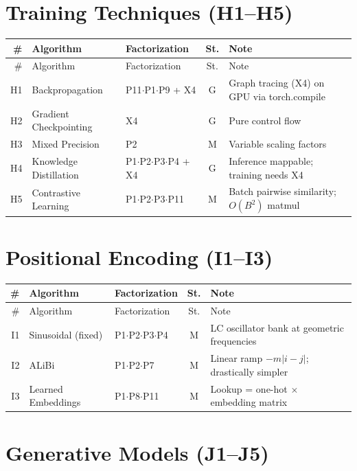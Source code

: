 \documentclass[10pt]{article}
\begin{document}
\section{Training Techniques (H1--H5)}

\begin{longtable}{rlp{3.0cm}cp{4.8cm}}
\toprule
\# & Algorithm & Factorization & St. & Note \\
\midrule
\endfirsthead
\toprule
\# & Algorithm & Factorization & St. & Note \\
\midrule
\endhead
\bottomrule
\endfoot
H1 & Backpropagation & P11$\cdot$P1$\cdot$P9 + X4 & G & Graph tracing (X4) on GPU via torch.compile \\
H2 & Gradient Checkpointing & X4 & G & Pure control flow \\
H3 & Mixed Precision & P2 & M & Variable scaling factors \\
H4 & Knowledge Distillation & P1$\cdot$P2$\cdot$P3$\cdot$P4 + X4 & G & Inference mappable; training needs X4 \\
H5 & Contrastive Learning & P1$\cdot$P2$\cdot$P3$\cdot$P11 & M & Batch pairwise similarity; $O(B^2)$ matmul \\
\end{longtable}

\section{Positional Encoding (I1--I3)}

\begin{longtable}{rlp{3.0cm}cp{4.8cm}}
\toprule
\# & Algorithm & Factorization & St. & Note \\
\midrule
\endfirsthead
\toprule
\# & Algorithm & Factorization & St. & Note \\
\midrule
\endhead
\bottomrule
\endfoot
I1 & Sinusoidal (fixed) & P1$\cdot$P2$\cdot$P3$\cdot$P4 & M & LC oscillator bank at geometric frequencies \\
I2 & ALiBi & P1$\cdot$P2$\cdot$P7 & M & Linear ramp $-m|i-j|$; drastically simpler \\
I3 & Learned Embeddings & P1$\cdot$P8$\cdot$P11 & M & Lookup = one-hot $\times$ embedding matrix \\
\end{longtable}

\section{Generative Models (J1--J5)}
\end{document}
